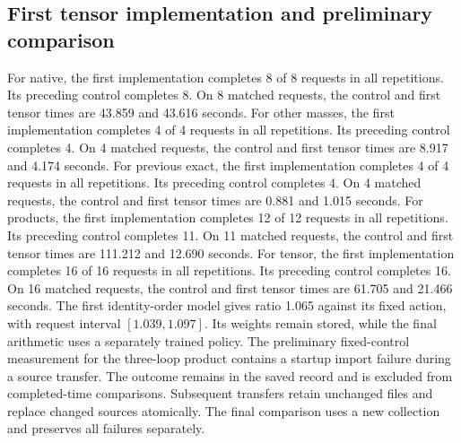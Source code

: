 \subsection{First tensor implementation and preliminary comparison}
For native, the first implementation completes 8 of 8 requests in all repetitions. Its preceding control completes 8. On 8 matched requests, the control and first tensor times are 43.859 and 43.616 seconds.
For other masses, the first implementation completes 4 of 4 requests in all repetitions. Its preceding control completes 4. On 4 matched requests, the control and first tensor times are 8.917 and 4.174 seconds.
For previous exact, the first implementation completes 4 of 4 requests in all repetitions. Its preceding control completes 4. On 4 matched requests, the control and first tensor times are 0.881 and 1.015 seconds.
For products, the first implementation completes 12 of 12 requests in all repetitions. Its preceding control completes 11. On 11 matched requests, the control and first tensor times are 111.212 and 12.690 seconds.
For tensor, the first implementation completes 16 of 16 requests in all repetitions. Its preceding control completes 16. On 16 matched requests, the control and first tensor times are 61.705 and 21.466 seconds.
The first identity-order model gives ratio 1.065 against its fixed action, with request interval $[1.039,1.097]$. Its weights remain stored, while the final arithmetic uses a separately trained policy.
The preliminary fixed-control measurement for the three-loop product contains a startup import failure during a source transfer. The outcome remains in the saved record and is excluded from completed-time comparisons. Subsequent transfers retain unchanged files and replace changed sources atomically. The final comparison uses a new collection and preserves all failures separately.
